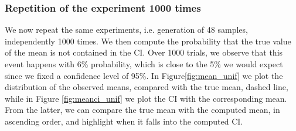 \documentclass[twoside,onecolumn]{article}
\theoremstyle{definition}
\begin{document}
\subsubsection{Repetition of the experiment 1000 times}
We now repeat the same experiments, i.e. generation of 48 samples, independently 1000 times. We then compute the probability that the true value of the mean is not contained in the CI. Over 1000 trials, we observe that this event happens with 6\% probability, which is close to the 5\% we would expect since we fixed a confidence level of 95\%.
In Figure\ref{fig:mean_unif} we plot the distribution of the observed means, compared with the true mean, dashed line, while in Figure \ref{fig:meanci_unif} we plot the CI with the corresponding mean. From the latter, we can compare the true mean with the computed mean, in ascending order, and highlight when it falls into the computed CI.
\end{document}
